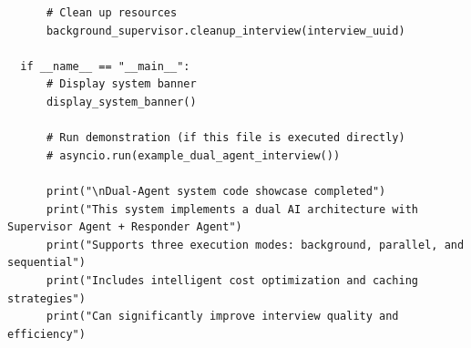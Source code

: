\documentclass[sigchi,nonacm,manuscript]{acmart}
\begin{document}
\begin{lstlisting}
      # Clean up resources
      background_supervisor.cleanup_interview(interview_uuid)

  if __name__ == "__main__":
      # Display system banner
      display_system_banner()
      
      # Run demonstration (if this file is executed directly)
      # asyncio.run(example_dual_agent_interview())
      
      print("\nDual-Agent system code showcase completed")
      print("This system implements a dual AI architecture with Supervisor Agent + Responder Agent")
      print("Supports three execution modes: background, parallel, and sequential")
      print("Includes intelligent cost optimization and caching strategies")
      print("Can significantly improve interview quality and efficiency")

\end{lstlisting}
\end{document}
